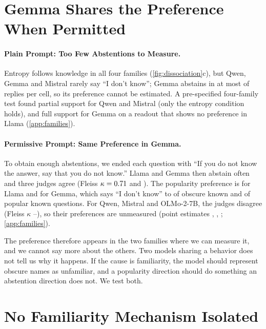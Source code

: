 \documentclass[manuscript,screen,review,anonymous,nonacm]{acmart}
\newcommand{\idk}{``I don't know''}
\begin{document}
\section{Gemma Shares the Preference When Permitted}
\label{sec:families}

\paragraph{Plain Prompt: Too Few Abstentions to Measure.} Entropy follows knowledge in all four families (\cref{fig:dissociation}c), but Qwen, Gemma and Mistral rarely say \idk; Gemma abstains in at most \tjGemmaObsUnk{} of replies per cell, so its preference cannot be estimated. A pre-specified four-family test found partial support for Qwen and Mistral (only the entropy condition holds), and full support for Gemma on a readout that shows no preference in Llama (\cref{app:families}).

\paragraph{Permissive Prompt: Same Preference in Gemma.} To obtain enough abstentions, we ended each question with ``If you do not know the answer, say that you do not know.'' Llama and Gemma then abstain often and three judges agree (Fleiss $\kappa=0.71$ and \pmGemmaKappa). The popularity preference is \pmLlamaDiff{} \pmLlamaDiffCI{} for Llama and \pmGemmaDiff{} \pmGemmaDiffCI{} for Gemma, which says \idk{} to \pmGemmaObsKnown{} of obscure known and \pmGemmaPopKnown{} of popular known questions. For Qwen, Mistral and OLMo-2-7B, the judges disagree (Fleiss $\kappa$ \pmQwenKappa--\pmMistralKappa), so their preferences are unmeasured (point estimates \pmQwenDiff, \pmMistralDiff, \pmOlmoDiff; \cref{app:families}).

The preference therefore appears in the two families where we can measure it, and we cannot say more about the others. Two models sharing a behavior does not tell us why it happens. If the cause is familiarity, the model should represent obscure names as unfamiliar, and a popularity direction should do something an abstention direction does not. We test both.

\section{No Familiarity Mechanism Isolated}
\label{sec:mech}
\end{document}
